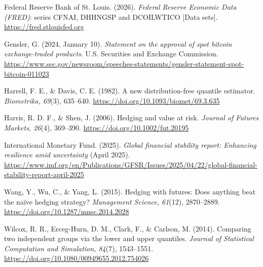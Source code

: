 \documentclass[11pt,letterpaper]{article}
\begin{document}
{\small\setlength{\parskip}{0pt}\hangindent=0.3in\noindent Federal Reserve Bank of St. Louis. (2026). \textit{Federal Reserve Economic Data (FRED)}: series CFNAI, DHHNGSP and DCOILWTICO [Data sets]. \url{https://fred.stlouisfed.org}\par}

{\small\setlength{\parskip}{0pt}\hangindent=0.3in\noindent Gensler, G. (2024, January 10). \textit{Statement on the approval of spot bitcoin exchange-traded products}. U.S. Securities and Exchange Commission. \url{https://www.sec.gov/newsroom/speeches-statements/gensler-statement-spot-bitcoin-011023}\par}

{\small\setlength{\parskip}{0pt}\hangindent=0.3in\noindent Harrell, F. E., \& Davis, C. E. (1982). A new distribution-free quantile estimator. \textit{Biometrika, 69}(3), 635–640. \url{https://doi.org/10.1093/biomet/69.3.635}\par}

{\small\setlength{\parskip}{0pt}\hangindent=0.3in\noindent Harris, R. D. F., \& Shen, J. (2006). Hedging and value at risk. \textit{Journal of Futures Markets, 26}(4), 369–390. \url{https://doi.org/10.1002/fut.20195}\par}

{\small\setlength{\parskip}{0pt}\hangindent=0.3in\noindent International Monetary Fund. (2025). \textit{Global financial stability report: Enhancing resilience amid uncertainty} (April 2025). \url{https://www.imf.org/en/Publications/GFSR/Issues/2025/04/22/global-financial-stability-report-april-2025}\par}

{\small\setlength{\parskip}{0pt}\hangindent=0.3in\noindent Wang, Y., Wu, C., \& Yang, L. (2015). Hedging with futures: Does anything beat the naïve hedging strategy? \textit{Management Science, 61}(12), 2870–2889. \url{https://doi.org/10.1287/mnsc.2014.2028}\par}

{\small\setlength{\parskip}{0pt}\hangindent=0.3in\noindent Wilcox, R. R., Erceg-Hurn, D. M., Clark, F., \& Carlson, M. (2014). Comparing two independent groups via the lower and upper quantiles. \textit{Journal of Statistical Computation and Simulation, 84}(7), 1543–1551. \url{https://doi.org/10.1080/00949655.2012.754026}\par}
\end{document}
